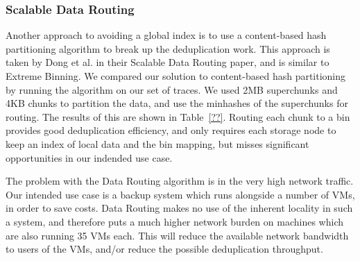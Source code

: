 {\subsubsection{Scalable Data Routing}
Another approach to avoiding a global index is to use a content-based hash
partitioning algorithm to break up the deduplication work. This approach is
taken by Dong et al. in their Scalable Data Routing paper, and is similar to
Extreme Binning\cite{??}\cite{extreme_binning09}. We compared our solution to
content-based hash partitioning by running the algorithm on our set of 
traces. We used 2MB superchunks and 4KB chunks to partition the data, and use
the minhashes of the superchunks for routing. The results of this are shown in
Table~\ref{??}. Routing each chunk to a bin provides good deduplication
efficiency, and only requires each storage node to keep an index of local data
and the bin mapping, but misses significant opportunities in our indended use
case.

The problem with the Data Routing algorithm is in the very high network traffic.
Our intended use case is a backup system which runs alongside a number of VMs,
in order to save costs. Data Routing makes no use of the inherent locality in
such a system, and therefore puts a much higher network burden on machines which
are also running 35 VMs each. This will reduce the available network bandwidth
to users of the VMs, and/or reduce the possible deduplication throughput.

}
